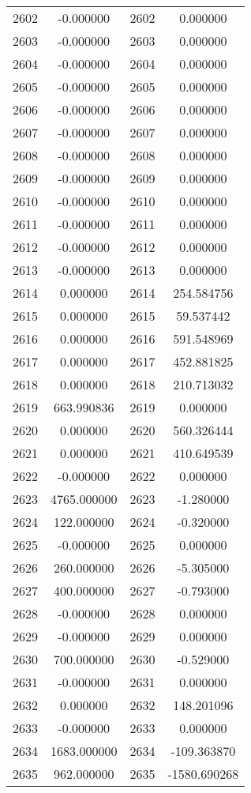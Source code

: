 \documentclass[12pt]{article}
\begin{document}
\begin{longtable}{@{}cccc@{}}
2602 & -0.000000 & 2602 & 0.000000 \\
2603 & -0.000000 & 2603 & 0.000000 \\
2604 & -0.000000 & 2604 & 0.000000 \\
2605 & -0.000000 & 2605 & 0.000000 \\
2606 & -0.000000 & 2606 & 0.000000 \\
2607 & -0.000000 & 2607 & 0.000000 \\
2608 & -0.000000 & 2608 & 0.000000 \\
2609 & -0.000000 & 2609 & 0.000000 \\
2610 & -0.000000 & 2610 & 0.000000 \\
2611 & -0.000000 & 2611 & 0.000000 \\
2612 & -0.000000 & 2612 & 0.000000 \\
2613 & -0.000000 & 2613 & 0.000000 \\
2614 & 0.000000 & 2614 & 254.584756 \\
2615 & 0.000000 & 2615 & 59.537442 \\
2616 & 0.000000 & 2616 & 591.548969 \\
2617 & 0.000000 & 2617 & 452.881825 \\
2618 & 0.000000 & 2618 & 210.713032 \\
2619 & 663.990836 & 2619 & 0.000000 \\
2620 & 0.000000 & 2620 & 560.326444 \\
2621 & 0.000000 & 2621 & 410.649539 \\
2622 & -0.000000 & 2622 & 0.000000 \\
2623 & 4765.000000 & 2623 & -1.280000 \\
2624 & 122.000000 & 2624 & -0.320000 \\
2625 & -0.000000 & 2625 & 0.000000 \\
2626 & 260.000000 & 2626 & -5.305000 \\
2627 & 400.000000 & 2627 & -0.793000 \\
2628 & -0.000000 & 2628 & 0.000000 \\
2629 & -0.000000 & 2629 & 0.000000 \\
2630 & 700.000000 & 2630 & -0.529000 \\
2631 & -0.000000 & 2631 & 0.000000 \\
2632 & 0.000000 & 2632 & 148.201096 \\
2633 & -0.000000 & 2633 & 0.000000 \\
2634 & 1683.000000 & 2634 & -109.363870 \\
2635 & 962.000000 & 2635 & -1580.690268 \\

\end{longtable}
\end{document}

